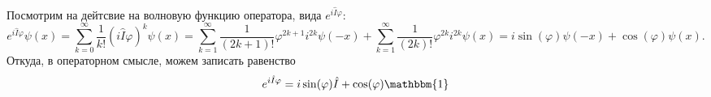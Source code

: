 Посмотрим на дейтсвие на волновую функцию оператора, вида $e^{i \hat{I} \varphi}$:
\begin{equation*}
    e^{i \hat{I} \varphi}  \psi(x) = 
    \sum_{k=0}^{\infty} \frac{1}{k!} \left(i \hat{I} \varphi\right)^k \psi(x) = 
    \sum_{k=1}^{\infty} \frac{1}{(2k+1)!} \varphi^{2k + 1} i^{2k} \psi(-x) + 
    \sum_{k=1}^{\infty}  \frac{1}{(2k)!} \varphi^{2k} i^{2k} \psi(x) = 
    i \sin (\varphi) \psi(-x) + \cos(\varphi) \psi(x).
\end{equation*}
Откуда, в операторном смысле, можем записать равенство
\begin{equation*}
    e^{i \hat{I} \varphi} = i \sin(\varphi) \hat{I} + \cos(\varphi) \mathbbm{1}
\end{equation*}